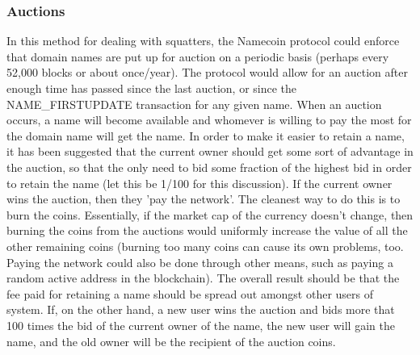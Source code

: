 \subsubsection{Auctions}
    In this method for dealing with squatters, the Namecoin protocol could enforce that domain names are put up for auction on a periodic basis (perhaps every 52,000 blocks or about once/year). The protocol would allow for an auction after enough time has passed since the last auction, or since the NAME\_FIRSTUPDATE transaction for any given name. When an auction occurs, a name will become available and whomever is willing to pay the most for the domain name will get the name. In order to make it easier to retain a name, it has been suggested that the current owner should get some sort of advantage in the auction, so that the only need to bid some fraction of the highest bid in order to retain the name (let this be 1/100 for this discussion). If the current owner wins the auction, then they 'pay the network'. The cleanest way to do this is to burn the coins. Essentially, if the market cap of the currency doesn't change, then burning the coins from the auctions would uniformly increase the value of all the other remaining coins (burning too many coins can cause its own problems, too. Paying the network could also be done through other means, such as paying a random active address in the blockchain). The overall result should be that the fee paid for retaining a name should be spread out amongst other users of system. If, on the other hand, a new user wins the auction and bids more that 100 times the bid of the current owner of the name, the new user will gain the name, and the old owner will be the recipient of the auction coins. 
